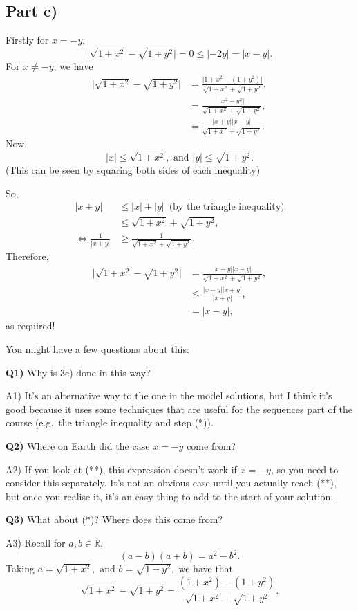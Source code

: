 \documentclass[
  17pt,
  a4paper]{extarticle}
\theoremstyle{plain}
\theoremstyle{definition}
\theoremstyle{plain}
\theoremstyle{plain}
\theoremstyle{plain}
\theoremstyle{plain}
\theoremstyle{definition}
\theoremstyle{definition}
\theoremstyle{remark}
\theoremstyle{remark}
\let\BeginKnitrBlock\begin \let\EndKnitrBlock\end
\renewcommand{\;}{\,}
\begin{document}
\hypertarget{part-c}{%
\subsection*{Part c)}\label{part-c}}

\BeginKnitrBlock{solution*}
Firstly for \(x = -y\), \[\lvert \sqrt{1 + x^2} - \sqrt{1 + y^2}\rvert = 0 \leq \lvert -2y \rvert = \lvert x - y \rvert.\] For \(x \neq -y\), we have
\begin{align}
\lvert \sqrt{1 + x^2} - \sqrt{1 + y^2}\rvert &= \frac{\lvert 1 + x^2 - (1 + y^2) \rvert}{\sqrt{1 + x^2} + \sqrt{1 + y^2}},\tag{*}\\
&= \frac{\lvert x^2 - y^2 \rvert}{\sqrt{1 + x^2} + \sqrt{1 + y^2}},\nonumber\\
&= \frac{\lvert x + y \rvert \lvert x - y \rvert}{\sqrt{1 + x^2} + \sqrt{1 + y^2}}.\nonumber
\end{align}
Now, \[\lvert x \rvert \leq \sqrt{1 + x^2}, \;\;\text{and}\;\; \lvert y \rvert \leq \sqrt{1 + y^2}.\] (This can be seen by squaring both sides of each inequality)

So,
\begin{align*}
\lvert x + y \rvert &\leq \lvert x \rvert + \lvert y \rvert \;\;\; \text{(by the triangle inequality)}\\
&\leq \sqrt{1 + x^2} + \sqrt{1 + y^2},\\
\Leftrightarrow \frac{1}{\lvert x + y \rvert} &\geq \frac{1}{\sqrt{1 + x^2} + \sqrt{1 + y^2}}.
\end{align*}
Therefore,
\begin{align}
\lvert \sqrt{1 + x^2} - \sqrt{1 + y^2}\rvert &= \frac{\lvert x + y \rvert \lvert x - y \rvert}{\sqrt{1 + x^2} + \sqrt{1 + y^2}},\nonumber\\
&\leq \frac{\lvert x - y \rvert\lvert x + y \rvert}{\lvert x + y \rvert},\tag{**}\\
&= \lvert x - y \rvert,\nonumber
\end{align}
as required!
\EndKnitrBlock{solution*}

You might have a few questions about this:

\textbf{Q1)} Why is 3c) done in this way?

A1) It's an alternative way to the one in the model solutions, but I think it's good because it uses some techniques that are useful for the sequences part of the course (e.g.~the triangle inequality and step (*)).

\textbf{Q2)} Where on Earth did the case \(x = -y\) come from?

A2) If you look at (**), this expression doesn't work if \(x = -y\), so you need to consider this separately. It's not an obvious case until you actually reach (**), but once you realise it, it's an easy thing to add to the start of your solution.

\textbf{Q3)} What about (*)? Where does this come from?

A3) Recall for \(a,b \in \mathbb{R}\), \[(a-b)(a+b) = a^2 - b^2.\] Taking \(a = \sqrt{1 + x^2}, \;\; \text{and} \;\; b = \sqrt{1 + y^2},\) we have that \[\sqrt{1 + x^2} - \sqrt{1 + y^2} = \frac{(1+x^2)-(1+y^2)}{\sqrt{1 + x^2} + \sqrt{1 + y^2}}.\]
\end{document}
